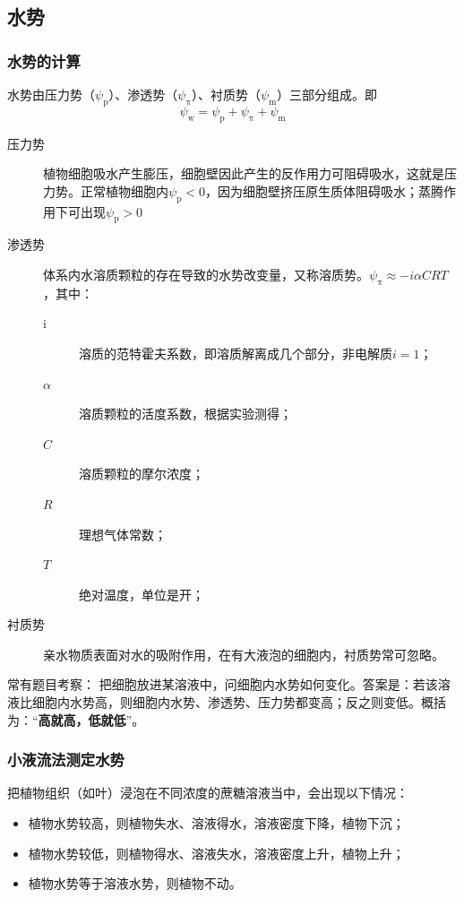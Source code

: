 \subsection{水势}

\subsubsection{水势的计算}

水势由压力势（$\psi_{\text{p}}$）、渗透势（$\psi_{\uppi}$）、衬质势（$\psi_{\text{m}}$）三部分组成。即\[\psi_{\text{w}}=\psi_{\text{p}}+\psi_{\uppi}+\psi_{\text{m}}\]

\begin{description}
	\item[压力势] 植物细胞吸水产生膨压，细胞壁因此产生的反作用力可阻碍吸水，这就是压力势。正常植物细胞内$\psi_{\text{p}}<0$，因为细胞壁挤压原生质体阻碍吸水；蒸腾作用下可出现$\psi_{\text{p}}>0$
	\item[渗透势] 体系内水溶质颗粒的存在导致的水势改变量，又称溶质势。$\psi_{\uppi}\approx-i\alpha CRT$，其中：
	\begin{description}
		\item[i] 溶质的范特霍夫系数，即溶质解离成几个部分，非电解质$i=1$；
		\item[$\alpha$] 溶质颗粒的活度系数，根据实验测得；
		\item[$C$] 溶质颗粒的摩尔浓度；
		\item[$R$] 理想气体常数；
		\item[$T$] 绝对温度，单位是开；
	\end{description}
	\item[衬质势] 亲水物质表面对水的吸附作用，在有大液泡的细胞内，衬质势常可忽略。
\end{description}

\begin{qj}[：植物细胞水势变化]
	常有题目考察： 把细胞放进某溶液中，问细胞内水势如何变化。答案是：若该溶液比细胞内水势高，则细胞内水势、渗透势、压力势都变高；反之则变低。概括为：“\textbf{高就高，低就低}”。
\end{qj}

\subsubsection{小液流法测定水势}

把植物组织（如叶）浸泡在不同浓度的蔗糖溶液当中，会出现以下情况：
\begin{itemize}
	\item 植物水势较高，则植物失水、溶液得水，溶液密度下降，植物下沉；
	\item 植物水势较低，则植物得水、溶液失水，溶液密度上升，植物上升；
	\item 植物水势等于溶液水势，则植物不动。
\end{itemize}

